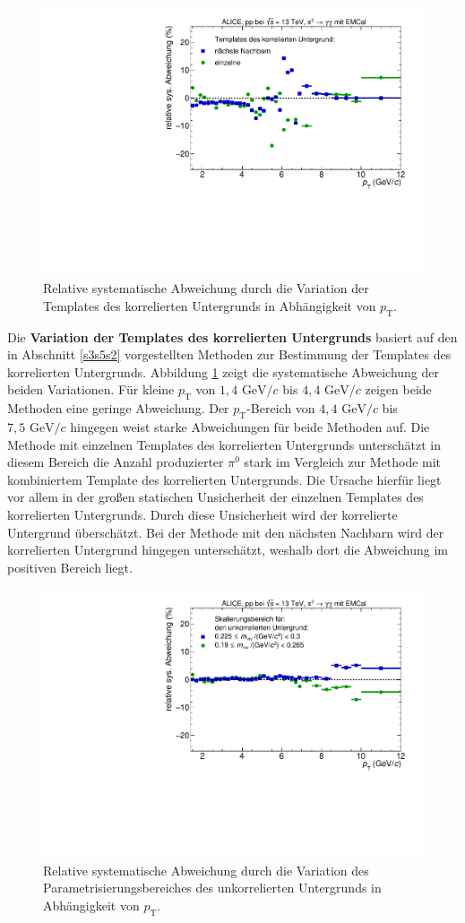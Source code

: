 \begin{figure}[t!]
\centering
\includegraphics[width=.65\linewidth]{YieldsSysUncerBkgVariation_Data_2016.pdf}
\caption{Relative systematische Abweichung durch die Variation der Templates des korrelierten Untergrunds in Abhängigkeit von $p_\text{T}$.}
\label{fig:BkgSys}
\end{figure}
\newline
Die \textbf{Variation der Templates des korrelierten Untergrunds} basiert auf den in Abschnitt \ref{s3s5s2} vorgestellten Methoden zur Bestimmung der Templates des korrelierten Untergrunds.
Abbildung \ref{fig:BkgSys} zeigt die systematische Abweichung der beiden Variationen.
Für kleine $p_\text{T}$ von $1,4 \text{ GeV}/c$ bis $4,4 \text{ GeV}/c$ zeigen beide Methoden eine geringe Abweichung.
Der $p_\text{T}$-Bereich von $4,4 \text{ GeV}/c$ bis $7,5 \text{ GeV}/c$ hingegen weist starke Abweichungen für beide Methoden auf.
Die Methode mit einzelnen Templates des korrelierten Untergrunds unterschätzt in diesem Bereich die Anzahl produzierter $\pi^{0}$ stark im Vergleich zur Methode mit kombiniertem Template des korrelierten Untergrunds.
Die Ursache hierfür liegt vor allem in der großen statischen Unsicherheit der einzelnen Templates des korrelierten Untergrunds.
Durch diese Unsicherheit wird der korrelierte Untergrund überschätzt.
Bei der Methode mit den nächsten Nachbarn wird der korrelierten Untergrund hingegen unterschätzt, weshalb dort die Abweichung im positiven Bereich liegt.
\begin{figure}[t!]
\centering
\includegraphics[width=.65\linewidth]{YieldsSysUncerUncorrBkgVariation_Data_2016.pdf}
\caption{Relative systematische Abweichung durch die Variation des Parametrisierungsbereiches des unkorrelierten Untergrunds in Abhängigkeit von $p_\text{T}$.}
\label{fig:LeftBkgSys}
\end{figure}
